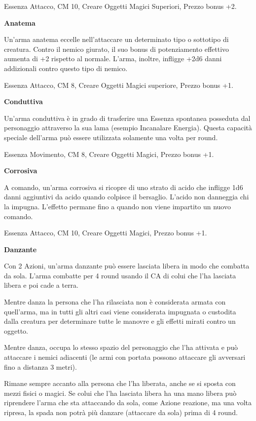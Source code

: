 \documentclass[a4paper,11pt,twoside,openany]{book}
\begin{document}
Essenza Attacco, CM 10, Creare Oggetti Magici Superiori, Prezzo bonus +2.

\textbf{Anatema}

Un'arma anatema eccelle nell'attaccare un determinato tipo o sottotipo di creatura. Contro il nemico giurato, il suo bonus di potenziamento effettivo aumenta di +2 rispetto al normale. L'arma, inoltre, infligge +2d6 danni addizionali contro questo tipo di nemico.

Essenza Attacco, CM 8, Creare Oggetti Magici superiore, Prezzo bonus +1.

\textbf{Conduttiva}

Un'arma conduttiva è in grado di trasferire una Essenza spontanea posseduta dal personaggio attraverso la sua lama (esempio Incanalare Energia). Questa capacità speciale dell'arma può essere utilizzata solamente una volta per round.

Essenza Movimento, CM 8, Creare Oggetti Magici, Prezzo bonus +1.

\textbf{Corrosiva}

A comando, un'arma corrosiva si ricopre di uno strato di acido che infligge 1d6 danni aggiuntivi da acido quando colpisce il bersaglio. L'acido non danneggia chi la impugna. L'effetto permane fino a quando non viene impartito un nuovo comando.

Essenza Attacco, CM 10, Creare Oggetti Magici, Prezzo bonus +1.

\textbf{Danzante}

Con 2 Azioni, un'arma danzante può essere lasciata libera in modo che combatta da sola. L'arma combatte per 4 round usando il CA di colui che l'ha lasciata libera e poi cade a terra.

Mentre danza la persona che l'ha rilasciata non è considerata armata con quell'arma, ma in tutti gli altri casi viene considerata impugnata o custodita dalla creatura per determinare tutte le manovre e gli effetti mirati contro un oggetto.

Mentre danza, occupa lo stesso spazio del personaggio che l'ha attivata e può attaccare i nemici adiacenti (le armi con portata possono attaccare gli avversari fino a distanza 3 metri).

Rimane sempre accanto alla persona che l'ha liberata, anche se si sposta con mezzi fisici o magici. Se colui che l'ha lasciata libera ha una mano libera può riprendere l'arma che sta attaccando da sola, come Azione reazione, ma una volta ripresa, la spada non potrà più danzare (attaccare da sola) prima di 4 round.
\end{document}
